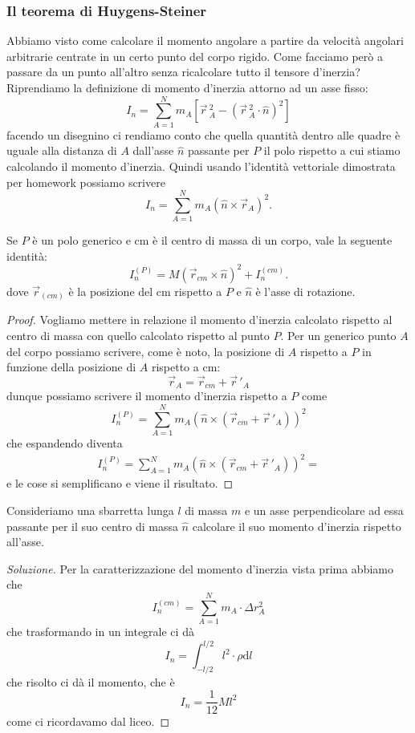 \documentclass[11pt]{scrartcl}
\newcommand{\dif}{\text{d}}
\newcommand{\posit}{\vec{r}}
\begin{document}
	\subsubsection{Il teorema di Huygens-Steiner}
	Abbiamo visto come calcolare il momento angolare a partire da velocità angolari arbitrarie centrate in un certo punto del corpo rigido. Come facciamo però a passare da un punto all'altro senza ricalcolare tutto il tensore d'inerzia? \\
	Riprendiamo la definizione di momento d'inerzia attorno ad un asse fisso:
	$$I_n=\sum_{A=1}^{N}m_A\left[\posit\,^2_A-\left(\posit\,^2_A\cdot \hat{n}\right)^2\right]$$
	facendo un disegnino ci rendiamo conto che quella quantità dentro alle quadre è uguale alla distanza di $A$ dall'asse $\hat{n}$ passante per $P$ il polo rispetto a cui stiamo calcolando il momento d'inerzia. Quindi usando l'identità vettoriale dimostrata per homework possiamo scrivere
	$$I_n=\sum_{A=1}^{N}m_A\left(\hat{n}\times \posit_A\right)^2.$$
	\begin{theorem}
		Se $P$ è un polo generico e cm è il centro di massa di un corpo, vale la seguente identità:
		$$I_n^{(P)}=M(\posit_{cm}\times \hat{n})^2+I_n^{(cm)}.$$
		dove $\posit_{(cm)}$ è la posizione del cm rispetto a $P$ e $\hat{n}$ è l'asse di rotazione.
	\end{theorem}
	\begin{proof}
		Vogliamo mettere in relazione il momento d'inerzia calcolato rispetto al centro di massa con quello calcolato rispetto al punto $P$. Per un generico punto $A$ del corpo possiamo scrivere, come è noto, la posizione di $A$ rispetto a $P$ in funzione della posizione di $A$ rispetto a cm:
		$$\posit_A=\posit_{cm}+\posit\,'_A$$
		dunque possiamo scrivere il momento d'inerzia rispetto a $P$ come
		$$I_n^{(P)}=\sum_{A=1}^{N}m_A\left(\hat{n}\times \left(\posit_{cm}+\posit\,'_A\right)\right)^2$$
		che espandendo diventa
		\begin{align*}
			I_n^{(P)}=\sum_{A=1}^{N}m_A\left(\hat{n}\times \left(\posit_{cm}+\posit\,'_A\right)\right)^2= 
		\end{align*}
		e le cose si semplificano e viene il risultato.
	\end{proof}
	
	\begin{example}
		Consideriamo una sbarretta lunga $l$ di massa $m$ e un asse perpendicolare ad essa passante per il suo centro di massa $\hat{n}$ calcolare il suo momento d'inerzia rispetto all'asse.
	\end{example}
	\begin{proof}[Soluzione]
		Per la caratterizzazione del momento d'inerzia vista prima abbiamo che
		$$I_n^{(cm)}=\sum_{A=1}^{N}m_A\cdot \Delta r_A^2$$
		che trasformando in un integrale ci dà
		$$I_n=\int_{-l/2}^{l/2}l^2 \cdot\rho  \dif l$$
		che risolto ci dà il momento, che è 
		$$I_n=\frac{1}{12}Ml^2$$
		come ci ricordavamo dal liceo.
	\end{proof}
	
\end{document}
